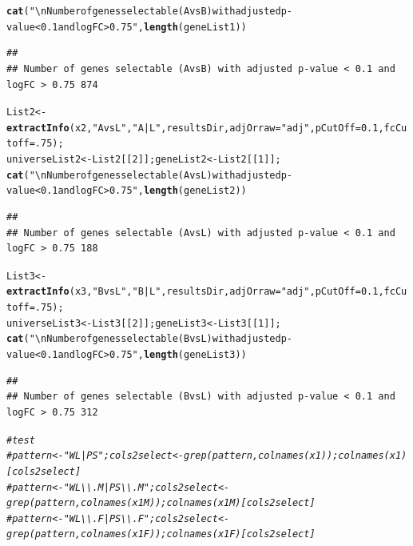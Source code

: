 \documentclass{article}\usepackage[]{graphicx}\usepackage[]{color}
\makeatletter
\newcommand{\hlnum}[1]{\textcolor[rgb]{0.686,0.059,0.569}{#1}}%
\newcommand{\hlstr}[1]{\textcolor[rgb]{0.192,0.494,0.8}{#1}}%
\newcommand{\hlcom}[1]{\textcolor[rgb]{0.678,0.584,0.686}{\textit{#1}}}%
\newcommand{\hlstd}[1]{\textcolor[rgb]{0.345,0.345,0.345}{#1}}%
\newcommand{\hlkwb}[1]{\textcolor[rgb]{0.69,0.353,0.396}{#1}}%
\newcommand{\hlkwc}[1]{\textcolor[rgb]{0.333,0.667,0.333}{#1}}%
\newcommand{\hlkwd}[1]{\textcolor[rgb]{0.737,0.353,0.396}{\textbf{#1}}}%
\newenvironment{kframe}{%
 \def\at@end@of@kframe{}%
 \ifinner\ifhmode%
  \def\at@end@of@kframe{\end{minipage}}%
  \begin{minipage}{\columnwidth}%
 \fi\fi%
 \def\FrameCommand##1{\hskip\@totalleftmargin \hskip-\fboxsep
 \colorbox{shadecolor}{##1}\hskip-\fboxsep
     \hskip-\linewidth \hskip-\@totalleftmargin \hskip\columnwidth}%
 \MakeFramed {\advance\hsize-\width
   \@totalleftmargin\z@ \linewidth\hsize
   \@setminipage}}%
 {\par\unskip\endMakeFramed%
 \at@end@of@kframe}
\newenvironment{knitrout}{}{} %
\makeatother
\begin{document}
\begin{knitrout}
\begin{kframe}
\begin{alltt}
\hlkwd{cat}\hlstd{(}\hlstr{"\textbackslash{}nNumber of genes selectable (AvsB) with adjusted p-value < 0.1 and logFC > 0.75"}\hlstd{,} \hlkwd{length}\hlstd{(geneList1))}
\end{alltt}
\begin{verbatim}
## 
## Number of genes selectable (AvsB) with adjusted p-value < 0.1 and logFC > 0.75 874
\end{verbatim}
\begin{alltt}
\hlstd{List2} \hlkwb{<-} \hlkwd{extractInfo}\hlstd{(x2,} \hlstr{"AvsL"}\hlstd{,} \hlstr{"A|L"}\hlstd{, resultsDir,} \hlkwc{adjOrraw}\hlstd{=}\hlstr{"adj"}\hlstd{,} \hlkwc{pCutOff}\hlstd{=}\hlnum{0.1}\hlstd{,} \hlkwc{fcCutoff}\hlstd{=}\hlnum{.75}\hlstd{);}
\hlstd{universeList2} \hlkwb{<-}\hlstd{List2[[}\hlnum{2}\hlstd{]]; geneList2}\hlkwb{<-} \hlstd{List2[[}\hlnum{1}\hlstd{]];}
\hlkwd{cat}\hlstd{(}\hlstr{"\textbackslash{}nNumber of genes selectable (AvsL) with adjusted p-value < 0.1 and logFC > 0.75"}\hlstd{,} \hlkwd{length}\hlstd{(geneList2))}
\end{alltt}
\begin{verbatim}
## 
## Number of genes selectable (AvsL) with adjusted p-value < 0.1 and logFC > 0.75 188
\end{verbatim}
\begin{alltt}
\hlstd{List3} \hlkwb{<-} \hlkwd{extractInfo}\hlstd{(x3,} \hlstr{"BvsL"}\hlstd{,} \hlstr{"B|L"}\hlstd{, resultsDir,} \hlkwc{adjOrraw}\hlstd{=}\hlstr{"adj"}\hlstd{,} \hlkwc{pCutOff}\hlstd{=}\hlnum{0.1}\hlstd{,} \hlkwc{fcCutoff}\hlstd{=}\hlnum{.75}\hlstd{);}
\hlstd{universeList3} \hlkwb{<-}\hlstd{List3[[}\hlnum{2}\hlstd{]]; geneList3}\hlkwb{<-} \hlstd{List3[[}\hlnum{1}\hlstd{]];}
\hlkwd{cat}\hlstd{(}\hlstr{"\textbackslash{}nNumber of genes selectable (BvsL) with adjusted p-value < 0.1 and logFC > 0.75"}\hlstd{,} \hlkwd{length}\hlstd{(geneList3))}
\end{alltt}
\begin{verbatim}
## 
## Number of genes selectable (BvsL) with adjusted p-value < 0.1 and logFC > 0.75 312
\end{verbatim}
\begin{alltt}
\hlcom{# test}
\hlcom{# pattern  <- "WL|PS"; cols2select<- grep(pattern, colnames(x1)); colnames(x1)[cols2select]}
\hlcom{# pattern  <- "WL\textbackslash{}\textbackslash{}.M|PS\textbackslash{}\textbackslash{}.M"; cols2select<- grep(pattern, colnames(x1M)); colnames(x1M)[cols2select]}
\hlcom{# pattern  <- "WL\textbackslash{}\textbackslash{}.F|PS\textbackslash{}\textbackslash{}.F"; cols2select<- grep(pattern, colnames(x1F)); colnames(x1F)[cols2select]}
\end{alltt}
\end{kframe}
\end{knitrout}
\end{document}
